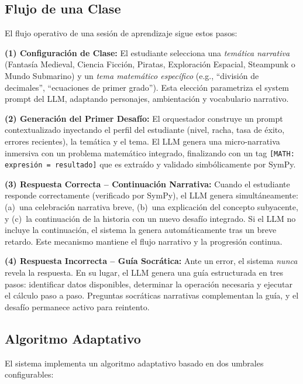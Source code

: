\documentclass{ieeetj}
\begin{document}
\subsection{Flujo de una Clase}

El flujo operativo de una sesi\'on de aprendizaje sigue estos pasos:

\textbf{(1) Configuraci\'on de Clase:} El estudiante selecciona una \textit{tem\'atica narrativa} (Fantas\'ia Medieval, Ciencia Ficci\'on, Piratas, Exploraci\'on Espacial, Steampunk o Mundo Submarino) y un \textit{tema matem\'atico espec\'ifico} (e.g., ``divisi\'on de decimales'', ``ecuaciones de primer grado''). Esta elecci\'on parametriza el system prompt del LLM, adaptando personajes, ambientaci\'on y vocabulario narrativo.

\textbf{(2) Generaci\'on del Primer Desaf\'io:} El orquestador construye un prompt contextualizado inyectando el perfil del estudiante (nivel, racha, tasa de \'exito, errores recientes), la tem\'atica y el tema. El LLM genera una micro-narrativa inmersiva con un problema matem\'atico integrado, finalizando con un tag \texttt{[MATH: expresi\'on = resultado]} que es extra\'ido y validado simb\'olicamente por SymPy.

\textbf{(3) Respuesta Correcta -- Continuaci\'on Narrativa:} Cuando el estudiante responde correctamente (verificado por SymPy), el LLM genera simult\'aneamente: (a)~una celebraci\'on narrativa breve, (b)~una explicaci\'on del concepto subyacente, y (c)~la continuaci\'on de la historia con un nuevo desaf\'io integrado. Si el LLM no incluye la continuaci\'on, el sistema la genera autom\'aticamente tras un breve retardo. Este mecanismo mantiene el flujo narrativo y la progresi\'on continua.

\textbf{(4) Respuesta Incorrecta -- Gu\'ia Socr\'atica:} Ante un error, el sistema \textit{nunca} revela la respuesta. En su lugar, el LLM genera una gu\'ia estructurada en tres pasos: identificar datos disponibles, determinar la operaci\'on necesaria y ejecutar el c\'alculo paso a paso. Preguntas socr\'aticas narrativas complementan la gu\'ia, y el desaf\'io permanece activo para reintento.

\subsection{Algoritmo Adaptativo}

El sistema implementa un algoritmo adaptativo basado en dos umbrales configurables:
\end{document}
